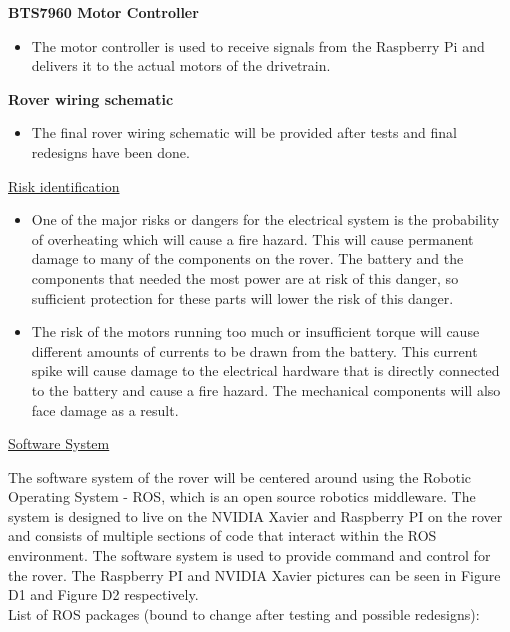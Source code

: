 \documentclass[a4paper, 10pt]{article}
\begin{document}
\textbf{BTS7960 Motor Controller}

\begin{itemize}
\item
	The motor controller is used to receive signals from the Raspberry Pi and delivers it to the actual motors of the drivetrain.
\end{itemize}

\textbf{Rover wiring schematic}

\begin{itemize}
\item
	The final rover wiring schematic will be provided after tests and final redesigns have been done. 
\end{itemize}

\underline{Risk identification}

\begin{itemize}
\item
	One of the major risks or dangers for the electrical system is the probability of overheating which will cause a fire hazard. This will cause permanent damage to many of the components on the rover. The battery and the components that needed the most power are at risk of this danger, so sufficient protection for these parts will lower the risk of this danger.

\item
	The risk of the motors running too much or insufficient torque will cause different amounts of currents to be drawn from the battery. This current spike will cause damage to the electrical hardware that is directly connected to the battery and cause a fire hazard. The mechanical components will also face damage as a result.
\end{itemize}

\underline{Software System}

The software system of the rover will be centered around using the Robotic Operating System - ROS, which is an open source robotics middleware. The system is designed to live on the NVIDIA Xavier and Raspberry PI on the rover and consists of multiple sections of code that interact within the ROS environment. The software system is used to provide command and control for the rover. The Raspberry PI and NVIDIA Xavier pictures can be seen in Figure D1 and Figure D2 respectively. \\

List of ROS packages (bound to change after testing and possible redesigns): \\
\end{document}
